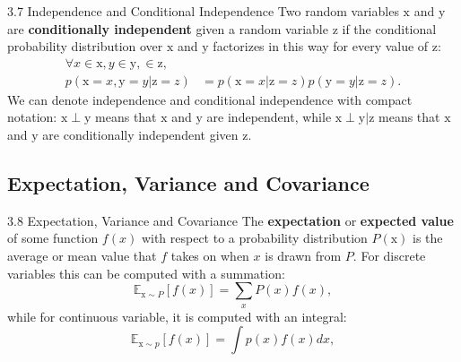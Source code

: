 \begin{frame}{3.7 Independence and Conditional Independence}
    \justifying
    Two random variables $\mathrm{x}$ and $\mathrm{y}$ are \textbf{conditionally independent} given a random variable $\mathrm{z}$ if the conditional probability distribution over $\mathrm{x}$ and $\mathrm{y}$ factorizes in this way for every value of $\mathrm{z}$:
    \begin{align}
        \forall x \in \mathrm{x}, y \in \mathrm{y},  \in \mathrm{z}, &\nonumber \\ 
        p(\mathrm{x} = x, \mathrm{y} = y | \mathrm{z} = z) &= p(\mathrm{x} = x | \mathrm{z} = z) p(\mathrm{y} = y | \mathrm{z} = z).
        \label{eq:3_8}    
    \end{align}
    We can denote independence and conditional independence with compact notation: $\mathrm{x} \perp \mathrm{y}$ means that $\mathrm{x}$ and $\mathrm{y}$ are independent, while $\mathrm{x} \perp \mathrm{y} | \mathrm{z}$ means that $\mathrm{x}$ and $\mathrm{y}$ are conditionally independent given $\mathrm{z}$.
\end{frame}

\subsection{Expectation, Variance and Covariance}
\begin{frame}{3.8 Expectation, Variance and Covariance}
    \justifying
    The \textbf{expectation} or \textbf{expected value} of some function $f(x)$ with respect to a probability distribution $P(\mathrm{x})$ is the average or mean value that $f$ takes on when $x$ is drawn from $P$. For discrete variables this can be computed with a summation:
    \begin{equation}
        \mathbb{E}_{\mathrm{x} \sim P}[f(x)] = \sum_{x} P(x) f(x),
        \label{eq:3_9}
    \end{equation}
    while for continuous variable, it is computed with an integral:
    \begin{equation}
        \mathbb{E}_{\mathrm{x} \sim p}[f(x)] = \int p(x) f(x)dx,
        \label{eq:3_10}
    \end{equation}
\end{frame}{}

